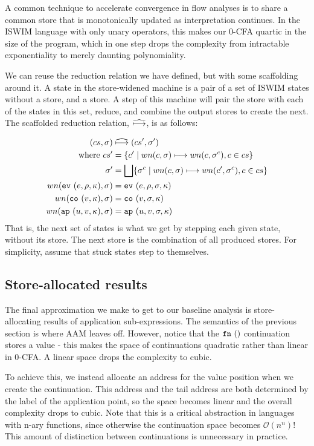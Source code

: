 \documentclass[preprint,onecolumn,9pt]{sigplanconf} %
\begin{document}
A common technique to accelerate convergence in flow analyses is to share
a common store that is monotonically updated as interpretation
continues. In the ISWIM language with only unary operators, this makes
our 0-CFA quartic in the size of the program, which in one step drops the
complexity from intractable exponentiality to merely daunting
polynomiality.

We can reuse the reduction relation we have defined, but with some
scaffolding around it. A state in the store-widened machine is a pair
of a set of ISWIM states without a store, and a store. A step of this
machine will pair the store with each of the states in this set,
reduce, and combine the output stores to create the next. The
scaffolded reduction relation, $\widehat{\longmapsto}$, is as follows:

\begin{align*}
(cs, \sigma) &\mathrel{\widehat{\longmapsto}} (cs', \sigma') \\
\mbox{where } cs' &= \{c' \mid wn(c, \sigma) \longmapsto wn(c, \sigma^c), c \in cs\} \\
              \sigma' &= \bigsqcup\{\sigma^c \mid wn(c,\sigma)\longmapsto wn(c', \sigma^c), c \in cs\} \\
wn({\tt ev{\ }}({e, \rho, \kappa}), \sigma) &= {\tt ev{\ }}({e, \rho, \sigma, \kappa}) \\
wn({\tt co{\ }}({v, \kappa}), \sigma) &= {\tt co{\ }}({v, \sigma, \kappa}) \\
wn({\tt ap{\ }}({u, v, \kappa}), \sigma) &= {\tt ap{\ }}({u, v, \sigma, \kappa})
\end{align*}
That is, the next set of states is what we get by stepping each
given state, without its store. The next store is the combination of all produced
stores. For simplicity, assume that stuck states step to themselves.

\subsection{Store-allocated results}
\label{sec:baselineeval}

The final approximation we make to get to our baseline analysis is
store-allocating results of application sub-expressions. The semantics
of the previous section is where AAM leaves off. However, notice that
the ${\tt fn{\ }}({})$ continuation stores a value - this makes the space of
continuations quadratic rather than linear in 0-CFA. A linear space
drops the complexity to cubic.

To achieve this, we instead allocate an address for the value position
when we create the continuation.  This address and the tail address
are both determined by the label of the application point, so the
space becomes linear and the overall complexity drops to cubic. Note
that this is a critical abstraction in languages with n-ary functions,
since otherwise the continuation space becomes ${\mathcal O}(n^n)$!
This amount of distinction between continuations is unnecessary
in practice.
\end{document}
